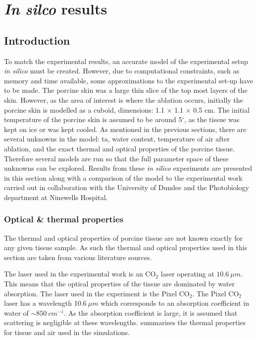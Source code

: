 


\section{\textit{In silco} results} 

\subsection{Introduction}

To match the experimental results,  an accurate model of the experimental setup \textit{in silico} must be created. However, due to computational constraints, such as memory and time available, some approximations to the experimental set-up have to be made. The porcine skin was a large thin slice of the top most layers of the skin. However, as the area of interest is where the ablation occurs, initially the porcine skin is modelled as a cuboid, dimensions:  1.1 $\times$ 1.1 $\times$ 0.5 cm. The initial temperature of the porcine skin is assumed to be around 5$^{\circ}$, as the tissue was kept on ice or was kept cooled. 
As mentioned in the previous sections, there are several unknowns in the model: \gls*{ta}, water content, temperature of air after ablation, and the exact thermal and optical properties of the porcine tissue. Therefore several models are run so that the full parameter space of these unknowns can be explored.
Results from these \textit{in silico} experiments are presented in this section along with a comparison of the model to the experimental work carried out in collaboration with the University of Dundee and the Photobiology department at Ninewells Hospital.


\subsubsection*{Optical \& thermal properties}
\label{sec:opticalprops}
The thermal and optical properties of porcine tissue are not known exactly for any given tissue sample. As such the thermal and optical properties used in this section are taken from various literature sources.

The laser used in the experimental work is an CO$_2$ laser operating at $10.6\ \mu m$. This means that the optical properties of the tissue are dominated by water absorption. The laser used in the experiment is the Pixel CO$_2$\cite{pixelco2}. The Pixel CO$_2$ laser has a wavelength 10.6$~\mu m$ which corresponds to an absorption coefficient in water of $\sim 850~cm^{-1}$. As the absorption coefficient is large, it is assumed that scattering is negligible at these wavelengths.
 summarises the thermal properties for tissue and air used in the simulations.  

